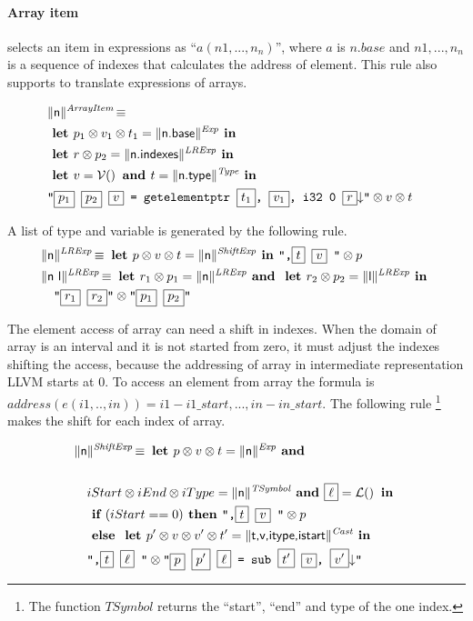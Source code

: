 \paragraph{Array item} selects an item in expressions as ``$a(n1,...,n_{n})$'', 
where $a$ is $n.base$ and $n1,...,n_{n}$ is a sequence of indexes that 
calculates the address of element. This rule also supports to translate 
expressions of arrays.

\begin{align*}
\lefteqn{\trad{n}{ArrayItem} \isdef} \\
&  \LET p_1 \sep v_1 \sep t_1  = \trad{n.base}{Exp}  \IN \\
&  \LET r \sep p_2  = \trad{n.indexes}{LRExp}  \IN \\
&  \LET v =  \variable \AND  t = \trad{\B{n.type}}{Type}  \IN \\
&  \llvm{"\PH{p_1} \PH{p_2} \PH{v} =  getelementptr \PH{t_1}, \PH{v_1}, i32 0 \PH{r}\nl"}  \sep v \sep t\\
\end{align*}

A list of type and variable is generated by the following rule.
\begin{align*}
&\trad{n}{LRExp} \isdef \LET p \sep v \sep t  = \trad{n}{ShiftExp}  \IN  \llvm{",\PH{t} \PH{v} "} \sep p\\
&\trad{n l}{LRExp} \isdef \LET r_1 \sep p_1 = \trad{n}{LRExp} \AND 
 \LET r_2 \sep p_2 = \trad{l}{LRExp} \IN\\
& \quad  \llvm{"\PH{r_1} \PH{r_2}"} \sep \llvm{"\PH{p_1} \PH{p_2}"}\\
\end{align*}


The element access of array can need a shift in indexes. When the domain of 
array is an interval and it is not started from zero, it must adjust the 
indexes shifting the access, because the addressing  of array in intermediate 
representation LLVM starts at 0. To access an element from array the formula is 
$address(e(i1,..,in))  = i1-i1\_start, ... , in-in\_start$. The following rule 
\footnote{The function $TSymbol$ returns the ``start'', ``end'' and type of the one 
index.} makes the shift for each index of array. 

\begin{align*}
&\trad{n}{ShiftExp} \isdef \LET p \sep v \sep t  = \trad{n}{Exp} \AND \\ \\
&\quad iStart \sep iEnd \sep iType = \trad{n}{TSymbol}  \AND  \PH{\ell} = \lbl \IN \\
&\quad \IF ( iStart == 0 ) \THEN  \llvm{",\PH{t} \PH{v} "} \sep p \\
&\quad \ELSE \LET  p' \sep v \sep v' \sep t'  = \trad{t,v,itype,istart}{Cast} \IN \\
&\quad \llvm{",\PH{t} \PH{\ell} "} \sep  \llvm{"\PH{p} \PH{p'}  \PH{\ell} = sub \PH{t'} \PH{v}, \PH{v'}\nl"}  \\
\end{align*}

